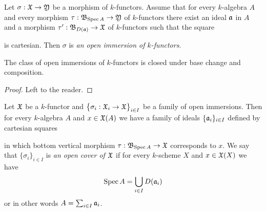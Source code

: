 \begin{definition}
Let $\sigma:{\mathfrak X}\rightarrow {\mathfrak Y}$ be a morphism of $k$-functors. Assume that for every $k$-algebra $A$ and every morphism $\tau:{\mathfrak B}_{\mathrm{Spec}\, A}\rightarrow {\mathfrak Y}$ of $k$-functors there exist an ideal $\mathfrak{a}$ in $A$ and a morphism $\tau':{\mathfrak B}_{D(\mathfrak{a})}\rightarrow {\mathfrak X}$ of $k$-functors such that the square
\begin{center}
\end{center}
is cartesian. Then $\sigma$ is \textit{an open immersion of $k$-functors}.
\end{definition}

\begin{fact}\label{fact:openimmersionsclosedunderbasechangeandcomposition}
The class of open immersions of $k$-functors is closed under base change and composition.
\end{fact}
\begin{proof}
Left to the reader.
\end{proof}

\begin{definition}
Let ${\mathfrak X}$ be a $k$-functor and $\big\{\sigma_i:{\mathfrak X}_i\rightarrow {\mathfrak X}\big\}_{i\in I}$ be a family of open immersions. Then for every $k$-algebra $A$ and $x\in {\mathfrak X}(A)$ we have a family of ideals $\{\mathfrak{a}_i\}_{i\in I}$ defined by cartesian squares
\begin{center}
\end{center}
in which bottom vertical morphism $\tau:{\mathfrak B}_{\mathrm{Spec}\, A}\rightarrow {\mathfrak X}$ corresponds to $x$. We say that $\{\sigma_i\}_{i\in I}$ is \textit{an open cover of ${\mathfrak X}$} if for every $k$-scheme $X$ and $x\in {\mathfrak X}(X)$ we have
$$\mathrm{Spec}\, A=\bigcup_{i\in I}D(\mathfrak{a}_i)$$
or in other words $A = \sum_{i\in I}\mathfrak{a}_i$.
\end{definition}

